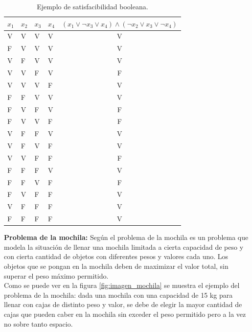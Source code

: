 \begin{table}[hbtp]
 \centering
    \caption{Ejemplo de satisfacibilidad booleana.} 
    \begin{tabular}{ | l | l | l | l | c |  }
    \hline
      \rowcolor[gray]{0.5}
       $x_1$ & $x_2$ & $x_3$ & $x_4$ & $(x_1\lor\neg x_3\lor x_4)\land(\neg x_2\lor x_3\lor\neg x_4) $ \\ \hline 
         V & V & V & V & V \\ \hline
         F & V & V & V & V \\ \hline
         V & F & V & V & V \\ \hline
         V & V & F & V & F \\ \hline
         V & V & V & F & V \\ \hline
         F & F & V & V & V \\ \hline
         F & V & F & V & F \\ \hline
         F & V & V & F & F \\ \hline
         V & F & F & V & V \\ \hline
         V & F & V & F & V \\ \hline
         V & V & F & F & F \\ \hline
         F & F & F & V & V \\ \hline
         F & F & V & F & F \\ \hline
         F & V & F & F & V \\ \hline
         V & F & F & F & V \\ \hline
         F & F & F & F & V \\ \hline
    \end{tabular}
    \label{table:Cap2_1}
    \end{table}
    \newpage
    
\textbf{Problema de la mochila:} 
Según \cite {[KARP]} el problema de la mochila es un problema que modela la situación de llenar una mochila limitada a cierta capacidad de peso y con cierta cantidad de objetos con diferentes pesos y valores cada uno. Los objetos que se pongan en la mochila deben de maximizar el valor total, sin superar el peso máximo permitido.\\
\hspace*{1cm}Como se puede ver en la figura \ref {fig:imagen_mochila} se muestra el ejemplo del problema de la mochila: dada una mochila con una capacidad de 15 kg para llenar con cajas de distinto peso y valor, se debe de elegir la mayor cantidad de cajas que pueden caber en la mochila sin exceder el peso permitido pero a la vez no sobre tanto espacio.

